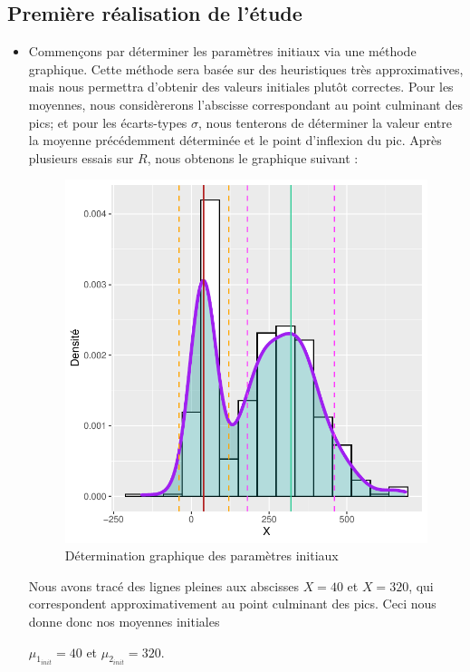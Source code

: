 \documentclass[frenchb]{report}
\newcommand{\1}{\mathbbm{1}}
\theoremstyle{definition}\newtheorem{defn}{Définition}
\theoremstyle{definition}\newtheorem{exm}{Exemple}
\theoremstyle{definition}\newtheorem{nota}{Notation}
\theoremstyle{definition}\newtheorem{rem}{Remarque}
\begin{document}
\subsection{Première réalisation de l'étude}
\begin{itemize}[label=\adfflowerleft]
\item
Commençons par déterminer les paramètres initiaux via une méthode graphique. Cette méthode sera basée sur des heuristiques très approximatives, mais nous permettra d'obtenir des valeurs initiales plutôt correctes. \newline
Pour les moyennes, nous considèrerons l'abscisse correspondant au point culminant des pics; et pour les écarts-types $\sigma$, nous tenterons de déterminer la valeur entre la moyenne précédemment déterminée et le point d'inflexion du pic. Après plusieurs essais sur $R$, nous obtenons le graphique suivant :
\begin{figure}[H]
\centering
\includegraphics[scale=0.8]{dens_1bis.pdf}
\caption{Détermination graphique des paramètres initiaux}
\end{figure}
Nous avons tracé des lignes pleines aux abscisses $X=40$ et $X=320$, qui correspondent approximativement au point culminant des pics. Ceci nous donne donc nos moyennes initiales 
\begin{center} 
$\mu_{1_{init}} =  40$ et $\mu_{2_{init}} = 320$. 

\end{center}
\end{itemize}
\end{document}

